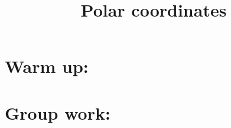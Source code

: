 \documentclass[]{ximera}
\title{Polar coordinates}
\begin{document}
\begin{abstract}		\end{abstract}
\maketitle



\section{Warm up:}

	\begin{freeResponse}
	
	\end{freeResponse}
	
\begin{instructorNotes}

\end{instructorNotes}







\section{Group work:}



\begin{problem}

	\begin{freeResponse}
	
	\end{freeResponse}
	
\end{problem}

\begin{instructorNotes}

\end{instructorNotes}







\begin{problem}

	\begin{freeResponse}
	
	\end{freeResponse}
		
\end{problem}

\begin{instructorNotes}

\end{instructorNotes}
\end{document}
